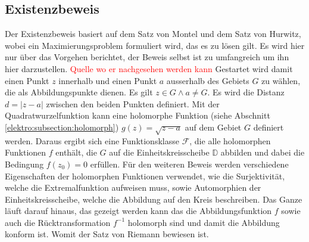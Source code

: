 \subsection{Existenzbeweis
\label{elektro:subsection:Riemannbeweis}}
Der Existenzbeweis basiert auf dem Satz von Montel und dem Satz von Hurwitz, wobei ein Maximierungsproblem formuliert wird, das es zu lösen gilt.
Es wird hier nur über das Vorgehen berichtet, der Beweis selbst ist zu umfangreich um ihn hier darzustellen. \textcolor{red}{Quelle wo er nachgesehen werden kann}
Gestartet wird damit einen Punkt $z$ innerhalb und einen Punkt $a$ ausserhalb des Gebiets $G$ zu wählen, die als Abbildungspunkte dienen. 
Es gilt $z \in G \land a \neq G$.
Es wird die Distanz $d = \vert z - a \vert$ zwischen den beiden Punkten definiert.
Mit der Quadratwurzelfunktion kann eine holomorphe Funktion (siehe Abschnitt \ref{elektro:subsection:holomorph}) $g(z) = \sqrt{z - a}$ auf dem Gebiet $G$ definiert werden.
Daraus ergibt sich eine Funktionsklasse $\mathcal{F}$, die alle holomorphen Funktionen $f$ enthält, die $G$ auf die Einheitskreisscheibe $\mathbb{D}$ abbilden und dabei die Bedingung $f(z_0) = 0$ erfüllen.
Für den weiteren Beweis werden verschiedene Eigenschaften der holomorphen Funktionen verwendet, wie die Surjektivität, welche die Extremalfunktion aufweisen muss, sowie Automorphien der Einheitskreisscheibe, welche die Abbildung auf den Kreis beschreiben.
Das Ganze läuft darauf hinaus, das gezeigt werden kann das die Abbildungsfunktion $f$ sowie auch die Rücktransformation $f^{-1}$ holomorph sind und damit die Abbildung konform ist. 
Womit der Satz von Riemann bewiesen ist.